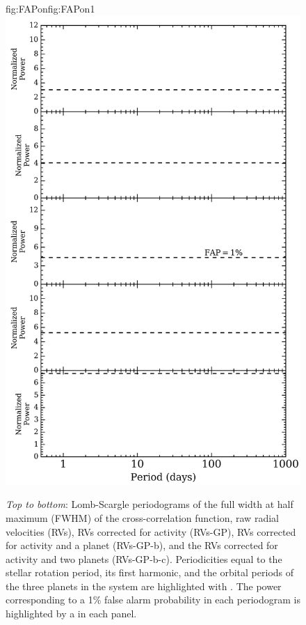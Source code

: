 \begin{figure}
\begin{ocg}{fig:FAPon}{fig:FAPon}{1}
    \includegraphics[width=0.8\hsize]{figures/periodograms_FAP.png}%
  \end{ocg}
  \hspace{-0.8\hsize}%
  \caption[Illustrating the iterative planet search with Lomb-Scargle periodograms.]
      {\small \emph{Top to bottom}: Lomb-Scargle periodograms of the full width at half maximum (FWHM)
    of the cross-correlation function, raw radial velocities (RVs), RVs corrected for activity (RVs-GP),
    RVs corrected for activity and a planet (RVs-GP-b), and the RVs corrected for activity and two planets
    (RVs-GP-b-c). Periodicities equal to the stellar rotation period, its first harmonic, and the
    orbital periods of the three planets in the system are highlighted with
    . The power
    corresponding to a 1\% false alarm probability in each periodogram is highlighted by a  
     in each panel.}
  \label{BSfig:periodograms}
\end{figure}

